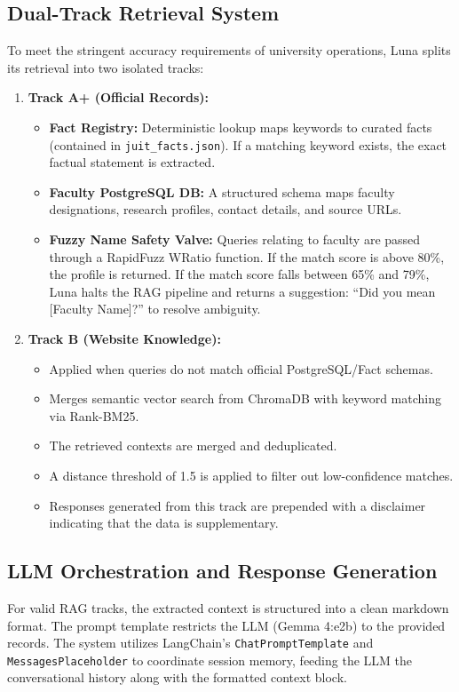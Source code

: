 \documentclass[12pt,a4paper]{article}
\begin{document}
\subsection{Dual-Track Retrieval System}
To meet the stringent accuracy requirements of university operations, Luna splits its retrieval into two isolated tracks:
\begin{enumerate}
    \item \textbf{Track A+ (Official Records):} 
    \begin{itemize}
        \item \textbf{Fact Registry:} Deterministic lookup maps keywords to curated facts (contained in \texttt{juit\_facts.json}). If a matching keyword exists, the exact factual statement is extracted.
        \item \textbf{Faculty PostgreSQL DB:} A structured schema maps faculty designations, research profiles, contact details, and source URLs.
        \item \textbf{Fuzzy Name Safety Valve:} Queries relating to faculty are passed through a RapidFuzz WRatio function. If the match score is above 80\%, the profile is returned. If the match score falls between 65\% and 79\%, Luna halts the RAG pipeline and returns a suggestion: ``Did you mean [Faculty Name]?'' to resolve ambiguity.
    \end{itemize}
    \item \textbf{Track B (Website Knowledge):}
    \begin{itemize}
        \item Applied when queries do not match official PostgreSQL/Fact schemas.
        \item Merges semantic vector search from ChromaDB with keyword matching via Rank-BM25.
        \item The retrieved contexts are merged and deduplicated.
        \item A distance threshold of 1.5 is applied to filter out low-confidence matches.
        \item Responses generated from this track are prepended with a disclaimer indicating that the data is supplementary.
    \end{itemize}
\end{enumerate}

\subsection{LLM Orchestration and Response Generation}
For valid RAG tracks, the extracted context is structured into a clean markdown format. The prompt template restricts the LLM (Gemma 4:e2b) to the provided records. The system utilizes LangChain's \texttt{ChatPromptTemplate} and \texttt{MessagesPlaceholder} to coordinate session memory, feeding the LLM the conversational history along with the formatted context block.
\end{document}
